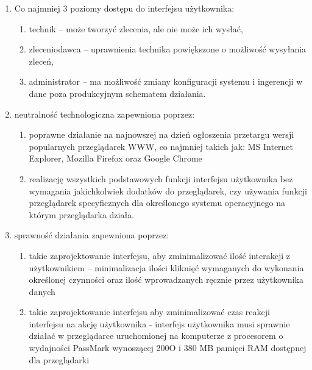 \documentclass[a4paper]{report}
\begin{document}
\begin{enumerate}
    \item Co najmniej 3 poziomy dostępu do interfejsu użytkownika:
        \begin{enumerate}
        \item technik -- może tworzyć zlecenia, ale nie może ich wysłać,
        \item zleceniodawca -- uprawnienia technika powiększone o możliwość wysyłania zleceń,
        \item administrator -- ma możliwość zmiany konfiguracji systemu i ingerencji w dane poza produkcyjnym schematem działania.
        \end{enumerate}
    \item neutralność technologiczna zapewniona poprzez:
	  \begin{enumerate}
	  \item poprawne działanie na najnowszej na dzień ogłoszenia przetargu wersji popularnych przeglądarek WWW, co najmniej takich jak: MS Internet Explorer, Mozilla Firefox oraz Google Chrome
	  \item realizację wszystkich podstawowych funkcji interfejsu użytkownika bez wymagania jakichkolwiek dodatków do przeglądarek, czy używania funkcji przeglądarek specyficznych dla określonego systemu operacyjnego na którym przeglądarka działa.
	  \end{enumerate}
    \item sprawność działania zapewniona poprzez:
	  \begin{enumerate}
	  \item takie zaprojektowanie interfejsu, aby zminimalizować ilość interakcji z użytkownikiem -- minimalizacja ilości kliknięć wymaganych do wykonania określonej czynności oraz ilość wprowadzanych ręcznie przez użytkownika danych
	  \item takie zaprojektowanie interfejsu aby zminimalizować czas reakcji interfejsu na akcję użytkownika - interfejs użytkownika musi sprawnie działać w przeglądarce uruchomionej na komputerze z procesorem o wydajności PassMark wynoszącej 200O i 380 MB pamięci RAM dostępnej dla przeglądarki
	  \end{enumerate}
\end{enumerate}
\end{document}
